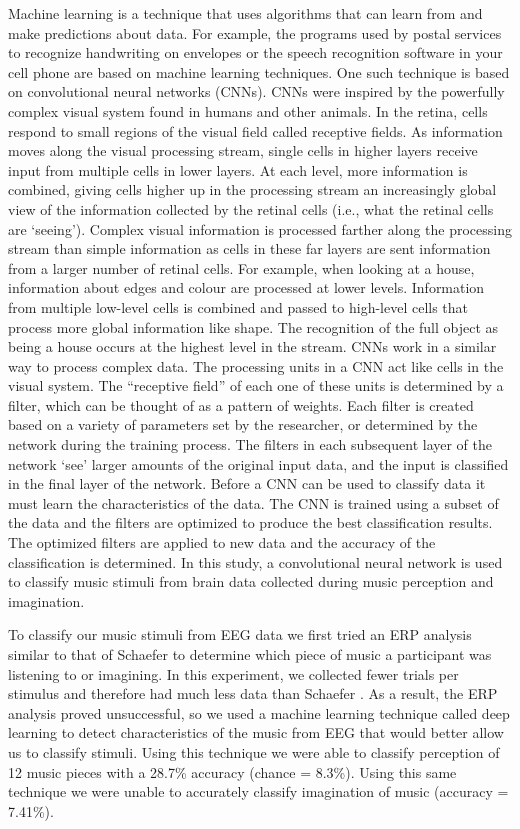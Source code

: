Machine learning is a technique that uses algorithms that can learn from and make predictions about data.
For example, the programs used by postal services to recognize handwriting on envelopes or the speech recognition software in your cell phone are based on machine learning techniques.
One such technique is based on convolutional neural networks (\acp{CNN}).
\acp{CNN} were inspired by the powerfully complex visual system found in humans and other animals.
In the retina, cells respond to small regions of the visual field \cite{hubel_receptive_1963} called receptive fields. 
As information moves along the visual processing stream, single cells in higher layers receive input from multiple cells in lower layers.
At each level, more information is combined, giving cells higher up in the processing stream an increasingly global view of the information collected by the retinal cells (i.e., what the retinal cells are `seeing').
Complex visual information is processed farther along the processing stream than simple information as cells in these far layers are sent information from a larger number of retinal cells.
For example, when looking at a house, information about edges and colour are processed at lower levels.
Information from multiple low-level cells is combined and passed to high-level cells that process more global information like shape. 
The recognition of the full object as being a house occurs at the highest level in the stream. 
\acp{CNN} work in a similar way to process complex data. 
The processing units in a \ac{CNN} act like cells in the visual system.
The ``receptive field'' of each one of these units is determined by a filter, which can be thought of as a pattern of weights.
Each filter is created based on a variety of parameters set by the researcher, or determined by the network during the training process.
The filters in each subsequent layer of the network `see' larger amounts of the original input data, and the input is classified in the final layer of the network. 
Before a \ac{CNN} can be used to classify data it must learn the characteristics of the data. 
The \ac{CNN} is trained using a subset of the data and the filters are optimized to produce the best classification results. 
The optimized filters are applied to new data and the accuracy of the classification is determined. 
In this study, a convolutional neural network is used to classify music stimuli from brain data collected during music perception and imagination. 

To classify our music stimuli from EEG data we first tried an ERP analysis similar to that of Schaefer \etal\citeyear{schaefer_name_2011} to determine which piece of music a participant was listening to or imagining.
In this experiment, we collected fewer trials per stimulus and therefore had much less data than Schaefer \etal\citeyear{schaefer_name_2011}. 
As a result, the ERP analysis proved unsuccessful, so we used a machine learning technique called deep learning to detect characteristics of the music from EEG that would better allow us to classify stimuli.
Using this technique we were able to classify perception of 12 music pieces with a 28.7\% accuracy (chance = 8.3\%).
Using this same technique we were unable to accurately classify imagination of music (accuracy = 7.41\%). 